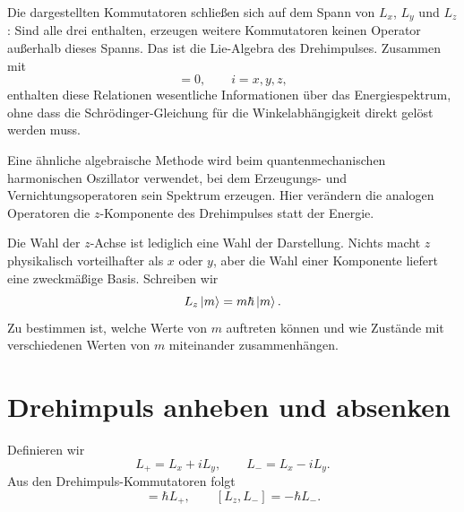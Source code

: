 Die dargestellten Kommutatoren schließen sich auf dem Spann von \(L_x\), \(L_y\) und \(L_z\): Sind alle drei enthalten, erzeugen weitere Kommutatoren keinen Operator außerhalb dieses Spanns. Das ist die Lie-Algebra des Drehimpulses. Zusammen mit
\begin{equation}
[H,L_i]=0,
\qquad i=x,y,z,
\end{equation}
enthalten diese Relationen wesentliche Informationen über das Energiespektrum, ohne dass die Schr\"odinger-Gleichung für die Winkelabhängigkeit direkt gelöst werden muss.

Eine ähnliche algebraische Methode wird beim quantenmechanischen harmonischen Oszillator verwendet, bei dem Erzeugungs- und Vernichtungsoperatoren sein Spektrum erzeugen. Hier verändern die analogen Operatoren die \(z\)-Komponente des Drehimpulses statt der Energie.

Die Wahl der \(z\)-Achse ist lediglich eine Wahl der Darstellung. Nichts macht \(z\) physikalisch vorteilhafter als \(x\) oder \(y\), aber die Wahl einer Komponente liefert eine zweckmäßige Basis. Schreiben wir
\begin{equation}
L_z\left\lvert m\right\rangle=m\hbar\left\lvert m\right\rangle.
\end{equation}
Zu bestimmen ist, welche Werte von \(m\) auftreten können und wie Zustände mit verschiedenen Werten von \(m\) miteinander zusammenhängen.

\begin{classroomqa}
\end{classroomqa}

\section{Drehimpuls anheben und absenken}

Definieren wir
\begin{equation}
L_+=L_x+iL_y,
\qquad
L_-=L_x-iL_y.
\end{equation}
Aus den Drehimpuls-Kommutatoren folgt
\begin{equation}
[L_z,L_+]=\hbar L_+,
\qquad
[L_z,L_-]=-\hbar L_-.
\end{equation}

